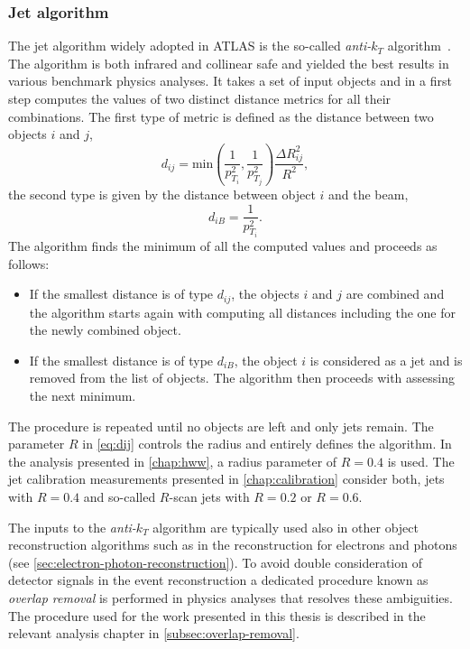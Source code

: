 

\subsubsection{Jet algorithm}
The jet algorithm widely adopted in ATLAS is the so-called \emph{anti-$k_T$} algorithm~\cite{Cacciari:2008gp}. The algorithm is both infrared and collinear safe and yielded the best results in various benchmark physics analyses. 
It takes a set of input objects and in a first step computes the values of two distinct distance metrics for all their combinations.
The first type of metric is defined as the distance between two objects $i$ and $j$, 
\begin{equation}
    d_{ij} = \text{min}\left(\frac{1}{p_{T_i}^2},\frac{1}{p_{T_j}^2}\right) \frac{\Delta R_{ij}^2}{R^2},
    \label{eq:dij}
\end{equation}
the second type is given by the distance between object $i$ and the beam, 
    \begin{equation}
        d_{iB} = \frac{1}{p_{T_i}^2}.
\end{equation}
The algorithm finds the minimum of all the computed values and proceeds as follows:
\begin{itemize}
    \item If the smallest distance is of type $d_{ij}$, the objects $i$ and $j$ are combined and the algorithm starts again with computing all distances including the one for the newly combined object.
    \item If the smallest distance is of type $d_{iB}$, the object $i$ is considered as a jet and is removed from the list of objects. The algorithm then proceeds with assessing the next minimum.
\end{itemize}
The procedure is repeated until no objects are left and only jets remain. 
The parameter $R$ in \cref{eq:dij} controls the radius and entirely defines the algorithm. 
In the \HWW analysis presented in \cref{chap:hww}, a radius parameter of $R = 0.4$ is used. The jet calibration measurements presented in \cref{chap:calibration} consider both, jets with $R = 0.4$ and so-called $R$-scan jets with $R = 0.2$ or $R = 0.6$.

The inputs to the \emph{anti-$k_T$} algorithm are typically used also in other object reconstruction algorithms such as in the reconstruction for electrons and photons (see \cref{sec:electron-photon-reconstruction}). 
To avoid double consideration of detector signals in the event reconstruction a dedicated procedure known as \emph{overlap removal} is performed in physics analyses that resolves these ambiguities. The procedure used for the work presented in this thesis is described in the relevant analysis chapter in \cref{subsec:overlap-removal}.


